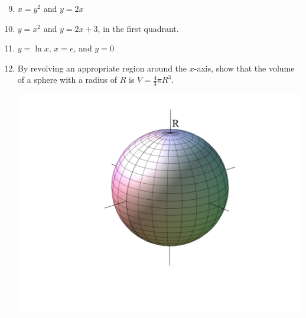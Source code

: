 \documentclass[12pt]{article}
\newif\ifans
\begin{document}

\begin{enumerate}
\setcounter{enumi}{8}

\item $x=y^2$ and $y=2x$

\ifans{\fbox{$\frac{\pi}{240}$}} \fi

\item $y=x^2$ and $y=2x+3$, in the first quadrant.

\ifans{\fbox{$\frac{45\pi}{2}$}} \fi

\item $y=\ln{x}$, $x=e$, and $y=0$

\ifans{\fbox{$\frac{\pi}{2}\left(1+e^2\right)$; Detailed Solution: \textcolor{blue}{\href{http://www.math.drexel.edu/classes/Calculus/resources/Math122HW/Solutions/122_08_Volume_11.pdf}{Here}}}} \fi

\item By revolving an appropriate region around the $x$-axis, show that the volume of a sphere with a radius of $R$ is $V=\frac{4}{3}\pi R^3$.

\begin{center}
\includegraphics[scale=0.4]{sphere.pdf}
\end{center}

\ifans{\fbox{\parbox{1\linewidth}{We revolve the region enclosed by the semicircle $y=\sqrt{R^2-x^2}$ and the $x$ axis on the interval $[-R,R]$ around the $x$-axis.
\begin{align*}
V &= \pi \int_{-R}^R (\sqrt{R^2-x^2})^2 \,dx\\
&= \pi \int_{-R}^R (R^2-x^2) \,dx\\
&= 2\pi \int_{0}^R (R^2-x^2) \,dx\\
&=2\pi\left[R^2x-\frac{1}{3}x^3\right]_{x=0}^{x=R}\\
&=2\pi\left(R^3-\frac{R^3}{3}\right)\\
&=\frac{4\pi}{3}R^3
\end{align*}
}}} \fi


\end{enumerate}
\end{document}
